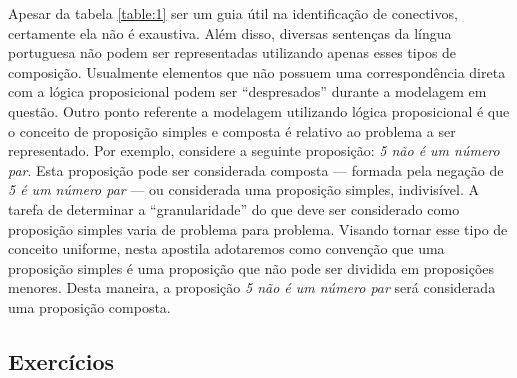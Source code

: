 Apesar da tabela \ref{table:1} ser um guia \'util na identifica\c{c}\~ao de conectivos, certamente ela n\~ao \'e exaustiva. Al\'em disso,
diversas senten\c{c}as da l\'ingua portuguesa n\~ao podem ser representadas utilizando apenas esses tipos de composi\c{c}\~ao. Usualmente
elementos que n\~ao possuem uma correspond\^encia direta com a l\'ogica proposicional podem ser ``despresados'' durante a modelagem em
quest\~ao. Outro ponto referente a modelagem utilizando l\'ogica proposicional \'e que o conceito de proposi\c{c}\~ao simples e composta
\'e relativo ao problema a ser representado. Por exemplo, considere a seguinte proposi\c{c}\~ao: \textit{5 n\~ao \'e um n\'umero par}. Esta
proposi\c{c}\~ao pode ser considerada composta --- formada pela nega\c{c}\~ao de \textit{5 \'e um n\'umero par} --- ou considerada uma
proposi\c{c}\~ao simples, indivis\'ivel. A tarefa de determinar a ``granularidade'' do que deve ser considerado como proposi\c{c}\~ao
simples varia de problema para problema. Visando tornar esse tipo de conceito uniforme, nesta apostila adotaremos como conven\c{c}\~ao que
uma proposi\c{c}\~ao simples \'e uma proposi\c{c}\~ao que n\~ao pode ser dividida em proposi\c{c}\~oes menores. Desta maneira, a proposi\c{c}\~ao
\textit{5 n\~ao \'e um n\'umero par} ser\'a considerada uma proposi\c{c}\~ao composta.

\subsection{Exerc\'icios}\label{cap1:ex1}

